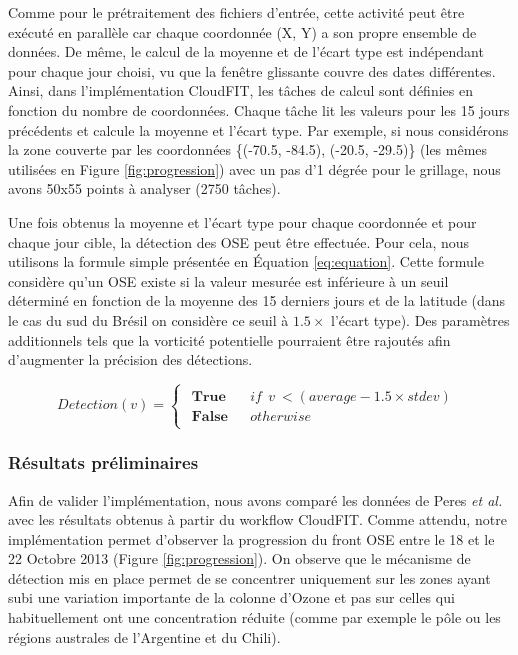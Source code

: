 Comme pour le prétraitement des fichiers d'entrée, cette activité peut être exécuté en parallèle car chaque coordonnée (X, Y) a son propre ensemble de données. De même, le calcul de la moyenne et de l'écart type est indépendant pour chaque jour choisi, vu que la fenêtre glissante couvre des dates différentes. Ainsi, dans l'implémentation CloudFIT, les tâches de calcul sont définies en fonction du nombre de coordonnées. Chaque tâche lit les valeurs pour les 15 jours précédents et calcule la moyenne et l'écart type. Par exemple, si nous considérons la zone couverte par les coordonnées \{(-70.5, -84.5), (-20.5, -29.5)\} (les mêmes utilisées en Figure \ref{fig:progression}) avec un pas d'1 dégrée pour le grillage, nous avons 50x55 points à analyser (2750 tâches). 

Une fois obtenus la moyenne et l'écart type pour chaque coordonnée et pour chaque jour cible, la détection des OSE peut être effectuée.  Pour cela, nous utilisons la formule simple présentée en Équation \ref{eq:equation}. Cette formule considère qu'un OSE existe si la valeur mesurée est inférieure à un seuil déterminé en fonction de la moyenne des 15 derniers jours et de la latitude (dans le cas du sud du Brésil on considère ce seuil à $1.5 \times$ l'écart type). Des paramètres additionnels tels que la vorticité potentielle pourraient être rajoutés afin d'augmenter la précision des détections.

\begin{equation}
Detection(v)=\left\{ \begin{array}{c}
\begin{array}{lll}
\textbf{True} & &if \:\: v \:< (average - 1.5\times stdev)\\
\textbf{False} & &otherwise\end{array}\end{array}\right.
\label{eq:equation}
\end{equation}



\subsubsection*{Résultats préliminaires}

Afin de valider l'implémentation, nous avons comparé les données de Peres \textit{et al.} \cite{Peres2013} avec les résultats obtenus à partir du workflow CloudFIT. Comme attendu, notre implémentation permet d'observer la progression du front OSE entre le 18 et le 22 Octobre 2013 (Figure \ref{fig:progression}). On observe que le mécanisme de détection mis en place permet de se concentrer uniquement sur les zones ayant subi une variation importante de la colonne d'Ozone et pas sur celles qui habituellement ont une concentration réduite (comme par exemple le pôle ou les régions australes de l'Argentine et du Chili). 

